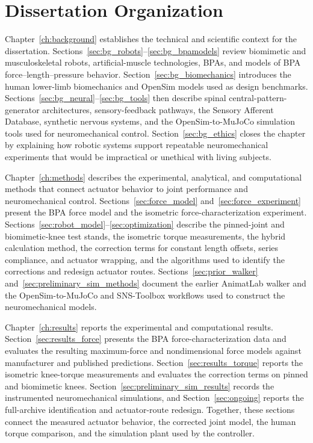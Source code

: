 \section{Dissertation Organization}\label{sec:organization}

\begin{reviewchange}
Chapter~\ref{ch:background} establishes the technical and scientific context for the dissertation. Sections~\ref{sec:bg_robots}--\ref{sec:bg_bpamodels} review biomimetic and musculoskeletal robots, artificial-muscle technologies, BPAs, and models of BPA force--length--pressure behavior. Section~\ref{sec:bg_biomechanics} introduces the human lower-limb biomechanics and OpenSim models used as design benchmarks. Sections~\ref{sec:bg_neural}--\ref{sec:bg_tools} then describe spinal central-pattern-generator architectures, sensory-feedback pathways, the Sensory Afferent Database, synthetic nervous systems, and the OpenSim-to-MuJoCo simulation tools used for neuromechanical control. Section~\ref{sec:bg_ethics} closes the chapter by explaining how robotic systems support repeatable neuromechanical experiments that would be impractical or unethical with living subjects.

Chapter~\ref{ch:methods} describes the experimental, analytical, and computational methods that connect actuator behavior to joint performance and neuromechanical control. Sections~\ref{sec:force_model} and~\ref{sec:force_experiment} present the BPA force model and the isometric force-characterization experiment. Sections~\ref{sec:robot_model}--\ref{sec:optimization} describe the pinned-joint and biomimetic-knee test stands, the isometric torque measurements, the hybrid calculation method, the correction terms for constant length offsets, series compliance, and actuator wrapping, and the algorithms used to identify the corrections and redesign actuator routes. Sections~\ref{sec:prior_walker} and~\ref{sec:preliminary_sim_methods} document the earlier AnimatLab walker and the OpenSim-to-MuJoCo and SNS-Toolbox workflows used to construct the neuromechanical models.

Chapter~\ref{ch:results} reports the experimental and computational results. Section~\ref{sec:results_force} presents the BPA force-characterization data and evaluates the resulting maximum-force and nondimensional force models against manufacturer and published predictions. Section~\ref{sec:results_torque} reports the isometric knee-torque measurements and evaluates the correction terms on pinned and biomimetic knees. Section~\ref{sec:preliminary_sim_results} records the instrumented neuromechanical simulations, and Section~\ref{sec:ongoing} reports the full-archive identification and actuator-route redesign. Together, these sections connect the measured actuator behavior, the corrected joint model, the human torque comparison, and the simulation plant used by the controller.


\end{reviewchange}
